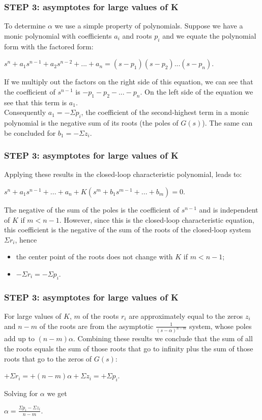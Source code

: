\begin{frame}
\frametitle{STEP 3: asymptotes for large values of K}
	To determine $\alpha$ we use a simple property of polynomials. Suppose we have a monic polynomial with coefficients $a_i$ and roots $p_i$ and we equate the polynomial form with the factored form:
	\begin{center}
		$s^n + a_1s^{n-1} + a_2s^{n-2} + ... + a_n = (s-p_1)(s-p_2)...(s-p_n).$
	\end{center}
	If we multiply out the factors on the right side of this equation, we can see that the coefficient of $s^{n-1}$ is $-p_1 - p_2 - ... - p_n$. On the left side of the equation we see that this term is $a_1$.\\
	\vspace{1em}
	Consequently $a_1 = -\Sigma p_i$, the coefficient of the second-highest term in a monic polynomial is the negative sum of its roots (the poles of $G(s)$). The same can be concluded for $b_1 = -\Sigma z_i$.
\end{frame}

\begin{frame}
\frametitle{STEP 3: asymptotes for large values of K}
	Applying these results in the closed-loop characteristic polynomial, leads to:
	\begin{center}
		$s^n + a_1 s^{n-1} + ... + a_n + K(s^m + b_1 s^{m-1} + ... + b_m) = 0$.
	\end{center}
	The negative of the sum of the poles is the coefficient of $s^{n-1}$ and is independent of $K$ if $m < n-1$. However, since this is the closed-loop characteristic equation, this coefficient is the negative of the sum of the roots of the closed-loop system $\Sigma r_i$, hence
	\begin{itemize}
		\item the center point of the roots does not change with $K$ if $m < n-1$;
		\item $-\Sigma r_i = -\Sigma p_i$.
	\end{itemize}
\end{frame}

\begin{frame}
\frametitle{STEP 3: asymptotes for large values of K}
	For large values of $K$, $m$ of the roots $r_i$ are approximately equal to the zeros $z_i$ and $n-m$ of the roots are from the asymptotic $\frac{1}{(s-\alpha)^{n-m}}$ system, whose poles add up to $(n-m)\alpha$. Combining these results we conclude that the sum of all the roots equals the sum of those roots that go to infinity plus the sum of those roots that go to the zeros of $G(s)$:
	\begin{center}
		$+\Sigma r_i = + (n-m)\alpha + \Sigma z_i = +\Sigma p_i$.
	\end{center}
	Solving for $\alpha$ we get 
	\begin{center}
		$\alpha = \frac{\Sigma p_i - \Sigma z_i}{n-m}$.
	\end{center}
\end{frame}

